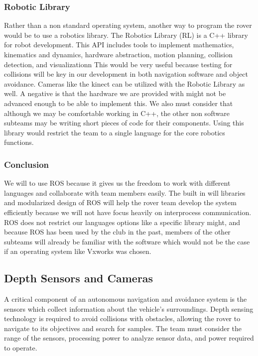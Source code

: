 \documentclass[10pt, oneside,onecolumn]{IEEEtran}
\begin{document}
\begin{titlepage}
\subsubsection{Robotic Library}

	Rather than a non standard operating system, another way to program the rover would be to use a robotics library. The Robotics Library (RL) is a C++ library for robot development. This API includes tools to implement mathematics, kinematics and dynamics, hardware abstraction, motion planning, collision detection, and visualizationn This would be very useful because testing for collisions will be key in our development in both navigation software and object avoidance. Cameras like the kinect can be utilized with the Robotic Library as well. A negative is that the hardware we are provided with might not be advanced enough to be able to implement this. We also must consider that although we may be comfortable working in C++, the other non software subteams may be writing short pieces of code for their components. Using this library would restrict the team to a single language for the core robotics functions. 

\subsubsection{Conclusion}

	We will to use ROS because it gives us the freedom to work with different languages and collaborate with team members easily. The built in will libraries and modularized design of ROS will help the rover team develop the system efficiently because we will not have focus heavily on interprocess communication. ROS does not restrict our languages options like a specific library might, and because ROS has been used by the club in the past, members of the other subteams will already be familiar with the software which would not be the case if an operating system like Vxworks was chosen. 

\subsection{Depth Sensors and Cameras}

	A critical component of an autonomous navigation and avoidance system is the sensors which collect information about the vehicle's surroundings. Depth sensing technology is required to avoid collisions with obstacles, allowing the rover to navigate to its objectives and search for samples. The team must consider the range of the sensors, processing power to analyze sensor data, and power required to operate.


\end{titlepage}
\end{document}

